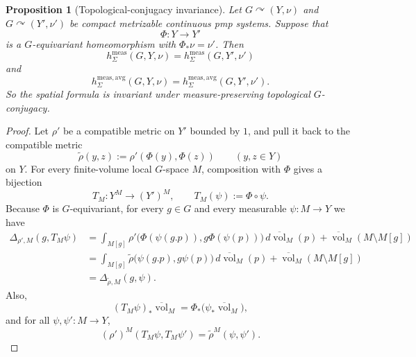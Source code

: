 \documentclass[12pt]{amsart}
\newtheorem{proposition}[proposition]{Proposition}
\theoremstyle{definition}
\newcommand{\vol}{\operatorname{vol}}
\newcommand{\1}{\mathbf 1}
\begin{document}
\begin{proposition}[Topological-conjugacy invariance]\label{prop:top-conj-invariance}
	Let $G\curvearrowright(Y,\nu)$ and $G\curvearrowright(Y',\nu')$ be compact metrizable continuous pmp systems. Suppose that
	\[
	\Phi:Y\longrightarrow Y'
	\]
	is a $G$-equivariant homeomorphism with $\Phi_*\nu=\nu'$. Then
	\[
	h^{\mathrm{meas}}_\Sigma(G,Y,\nu)=h^{\mathrm{meas}}_\Sigma(G,Y',\nu')
	\]
	and
	\[
	h^{\mathrm{meas,avg}}_\Sigma(G,Y,\nu)
	=h^{\mathrm{meas,avg}}_\Sigma(G,Y',\nu').
	\]
	So the spatial formula is invariant under measure-preserving topological $G$-conjugacy.
\end{proposition}

\begin{proof}
	Let $\rho'$ be a compatible metric on $Y'$ bounded by $1$, and pull it back to the compatible metric
	\[
	\widetilde\rho(y,z):=\rho'(\Phi(y),\Phi(z))
	\qquad(y,z\in Y)
	\]
	on $Y$. For every finite-volume local $G$-space $M$, composition with $\Phi$ gives a bijection
	\[
	T_M:Y^M\longrightarrow (Y')^M,
	\qquad T_M(\psi):=\Phi\circ\psi.
	\]
	Because $\Phi$ is $G$-equivariant, for every $g\in G$ and every measurable $\psi:M\to Y$ we have
	\begin{align*}
		\Delta_{\rho',M}(g,T_M\psi)
		&=\int_{M[g]}\rho'\bigl(\Phi(\psi(g.p)),g\Phi(\psi(p))\bigr)
		\,d\overline{\vol}_M(p)
		+\overline{\vol}_M(M\setminus M[g])\\
		&=\int_{M[g]}\widetilde\rho\bigl(\psi(g.p),g\psi(p)\bigr)
		\,d\overline{\vol}_M(p)
		+\overline{\vol}_M(M\setminus M[g])\\
		&=\Delta_{\widetilde\rho,M}(g,\psi).
	\end{align*}
	Also,
	\[
	(T_M\psi)_*\overline{\vol}_M
	=\Phi_*\bigl(\psi_*\overline{\vol}_M\bigr),
	\]
	and for all $\psi,\psi':M\to Y$,
	\[
	(\rho')^M(T_M\psi,T_M\psi')
	=\widetilde\rho^M(\psi,\psi').
	\]
	

\end{proof}
\end{document}
